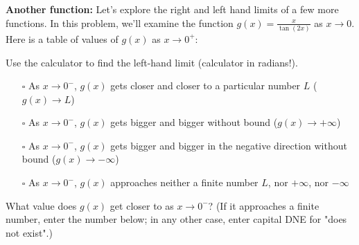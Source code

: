 \documentclass[pdftex, brazil, 12pt, twoside]{article}
\begin{document}
\begin{exercise}
  \textbf{Another function:} Let's explore the right and left hand limits of a
  few more functions. In this problem, we'll examine the function
  $\displaystyle g(x) = \frac{x}{\tan{(2x)}}$ as $x \to 0$.
  Here is a table of values of $g(x)$ as $x \to 0^{+}$:
  \begin{figure}[H]
  \begin{center}
  \end{center}
  \end{figure}
  Use the calculator to find the left-hand limit (calculator in radians!).
  \begin{itemize}[noitemsep]
  \item[$\square$] As $x \to 0^{-}$, $g(x)$ gets closer and closer to a particular number $L$
    ($g(x) \to L$)
  \item[$\square$] As $x \to 0^{-}$, $g(x)$ gets bigger and bigger without bound
    ($g(x) \to +\infty$)
\item[$\square$] As $x \to 0^{-}$, $g(x)$ gets bigger and bigger in the negative direction without bound
    ($g(x) \to -\infty$)  
\item[$\square$] As $x \to 0^{-}$, $g(x)$ approaches neither a finite number $L$, nor $+\infty$,
  nor $-\infty$
  \end{itemize}
\end{exercise}

\begin{exercise}
  What value does $g(x)$ get closer to as $x \to 0^{-}$? (If it approaches a finite
  number, enter the number below; in any other case, enter capital DNE for "does not exist".)
\end{exercise}
\end{document}
